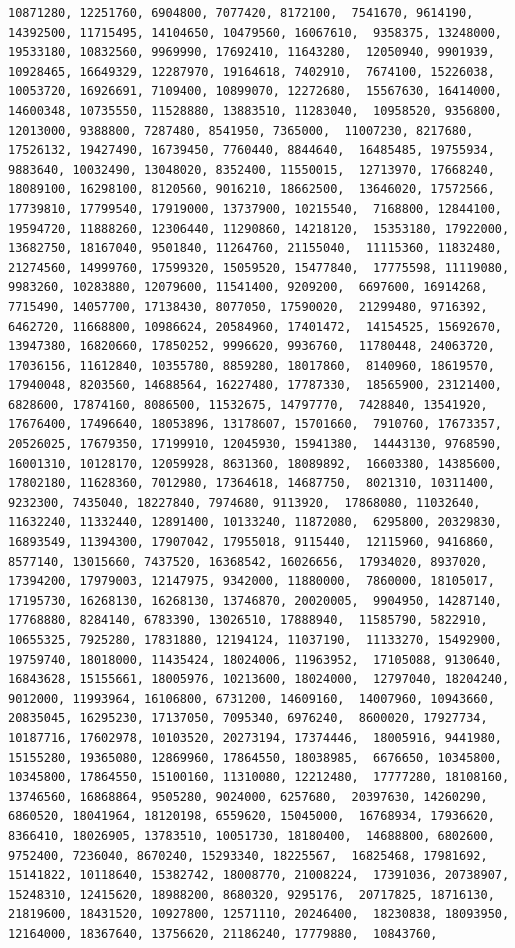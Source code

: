 \documentclass[
]{article}
\begin{document}
\begin{verbatim}
10871280, 12251760, 6904800, 7077420, 8172100,  7541670, 9614190, 14392500, 11715495, 14104650, 10479560, 16067610,  9358375, 13248000, 19533180, 10832560, 9969990, 17692410, 11643280,  12050940, 9901939, 10928465, 16649329, 12287970, 19164618, 7402910,  7674100, 15226038, 10053720, 16926691, 7109400, 10899070, 12272680,  15567630, 16414000, 14600348, 10735550, 11528880, 13883510, 11283040,  10958520, 9356800, 12013000, 9388800, 7287480, 8541950, 7365000,  11007230, 8217680, 17526132, 19427490, 16739450, 7760440, 8844640,  16485485, 19755934, 9883640, 10032490, 13048020, 8352400, 11550015,  12713970, 17668240, 18089100, 16298100, 8120560, 9016210, 18662500,  13646020, 17572566, 17739810, 17799540, 17919000, 13737900, 10215540,  7168800, 12844100, 19594720, 11888260, 12306440, 11290860, 14218120,  15353180, 17922000, 13682750, 18167040, 9501840, 11264760, 21155040,  11115360, 11832480, 21274560, 14999760, 17599320, 15059520, 15477840,  17775598, 11119080, 9983260, 10283880, 12079600, 11541400, 9209200,  6697600, 16914268, 7715490, 14057700, 17138430, 8077050, 17590020,  21299480, 9716392, 6462720, 11668800, 10986624, 20584960, 17401472,  14154525, 15692670, 13947380, 16820660, 17850252, 9996620, 9936760,  11780448, 24063720, 17036156, 11612840, 10355780, 8859280, 18017860,  8140960, 18619570, 17940048, 8203560, 14688564, 16227480, 17787330,  18565900, 23121400, 6828600, 17874160, 8086500, 11532675, 14797770,  7428840, 13541920, 17676400, 17496640, 18053896, 13178607, 15701660,  7910760, 17673357, 20526025, 17679350, 17199910, 12045930, 15941380,  14443130, 9768590, 16001310, 10128170, 12059928, 8631360, 18089892,  16603380, 14385600, 17802180, 11628360, 7012980, 17364618, 14687750,  8021310, 10311400, 9232300, 7435040, 18227840, 7974680, 9113920,  17868080, 11032640, 11632240, 11332440, 12891400, 10133240, 11872080,  6295800, 20329830, 16893549, 11394300, 17907042, 17955018, 9115440,  12115960, 9416860, 8577140, 13015660, 7437520, 16368542, 16026656,  17934020, 8937020, 17394200, 17979003, 12147975, 9342000, 11880000,  7860000, 18105017, 17195730, 16268130, 16268130, 13746870, 20020005,  9904950, 14287140, 17768880, 8284140, 6783390, 13026510, 17888940,  11585790, 5822910, 10655325, 7925280, 17831880, 12194124, 11037190,  11133270, 15492900, 19759740, 18018000, 11435424, 18024006, 11963952,  17105088, 9130640, 16843628, 15155661, 18005976, 10213600, 18024000,  12797040, 18204240, 9012000, 11993964, 16106800, 6731200, 14609160,  14007960, 10943660, 20835045, 16295230, 17137050, 7095340, 6976240,  8600020, 17927734, 10187716, 17602978, 10103520, 20273194, 17374446,  18005916, 9441980, 15155280, 19365080, 12869960, 17864550, 18038985,  6676650, 10345800, 10345800, 17864550, 15100160, 11310080, 12212480,  17777280, 18108160, 13746560, 16868864, 9505280, 9024000, 6257680,  20397630, 14260290, 6860520, 18041964, 18120198, 6559620, 15045000,  16768934, 17936620, 8366410, 18026905, 13783510, 10051730, 18180400,  14688800, 6802600, 9752400, 7236040, 8670240, 15293340, 18225567,  16825468, 17981692, 15141822, 10118640, 15382742, 18008770, 21008224,  17391036, 20738907, 15248310, 12415620, 18988200, 8680320, 9295176,  20717825, 18716130, 21819600, 18431520, 10927800, 12571110, 20246400,  18230838, 18093950, 12164000, 18367640, 13756620, 21186240, 17779880,  10843760, 
\end{verbatim}
\end{document}
